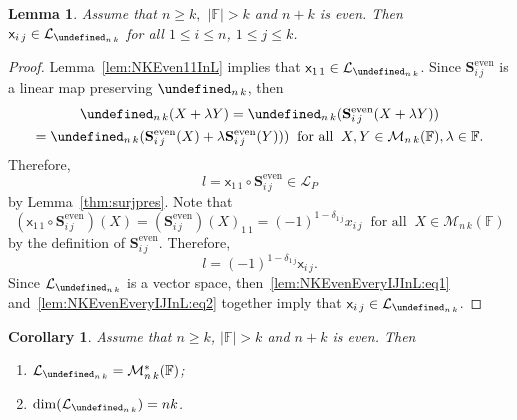 \documentclass{elsarticle}
\let\det\undefined
\DeclareMathOperator{\det}{det}
\def\F{{\mathbb F}}
\def\L{{\mathcal L}}
\def\M{{\mathcal M}}
\def\SCS{{\mathbf S}}
\newtheorem{lemma}[theorem]{Lemma}
\newtheorem{corollary}[theorem]{Corollary}
\theoremstyle{definition}
\numberwithin{equation}{section}
\begin{document}
\begin{lemma}\label{lem:NKEvenEveryIJInL}Assume that  $n \ge k,$ $|\F| > k$ and  $n + k$ is even.  Then $\mathsf x_{i\,j} \in \mathcal L_{\det_{n\,k}}$ for all $1 \le i \le n$, $1 \le j \le k$.
\end{lemma}

\begin{proof}Lemma~\ref{lem:NKEven11InL} implies that $\mathsf x_{1\,1} \in \mathcal L_{\det_{n\,k}}$. Since $\SCS^{\mathrm{even}}_{i\,j}$ is a linear map preserving $\det_{n\,k}$, then
\begin{multline*}
\det_{n\,k}(X + \lambda Y) = \det_{n\,k}(\SCS^{\mathrm{even}}_{i\,j}(X + \lambda Y))\\
 = \det_{n\,k}(\SCS^{\mathrm{even}}_{i\,j}(X) + \lambda \SCS^{\mathrm{even}}_{i\,j}(Y)))\;\;\mbox{for all}\;\;X, Y \in \M_{n\,k}(\F), \lambda \in \F.
\end{multline*}
Therefore, 
\begin{equation}\label{lem:NKEvenEveryIJInL:eq1}
l =  \mathsf x_{1\,1} \circ \SCS^{\mathrm{even}}_{i\,j} \in \mathcal L_P
\end{equation}
  by Lemma~\ref{thm:surjpres}. Note that
\begin{equation*}%
(\mathsf x_{1\,1} \circ \SCS^{\mathrm{even}}_{i\,j})(X) = (\SCS^{\mathrm{even}}_{i\,j})(X)_{1\,1} = (-1)^{1-\delta_{1\, j}}x_{i\,j}\;\;\mbox{for all}\;\;X \in \M_{n\,k}(\F)
\end{equation*}
by the definition of $\SCS^{\mathrm{even}}_{i\,j}$. Therefore,
\begin{equation}\label{lem:NKEvenEveryIJInL:eq2}
l = (-1)^{1-\delta_{1\, j}}\mathsf x_{i\,j}.
\end{equation}
Since $\L_{\det_{n\,k}}$ is a vector space, then~\eqref{lem:NKEvenEveryIJInL:eq1} and~\eqref{lem:NKEvenEveryIJInL:eq2} together imply that $\mathsf x_{i\,j} \in \L_{\det_{n\,k}}$. 
\end{proof}


\begin{corollary}\label{cor:DimNKEvenEqNK}Assume that  $n \ge k$, $|\F| > k$  and  $n + k$ is even. Then
\begin{enumerate}[label=(\alph*), ref=(\alph*)]
\item\label{cor:DimNKEvenEqNK:part1} $\L_{\det_{n\,k}} = \M_{n\,k}^*(\F)$;
\item\label{cor:DimNKEvenEqNK:part2} $\dim(\L_{\det_{n\,k}}) = nk$.
\end{enumerate}
\end{corollary}
\end{document}
